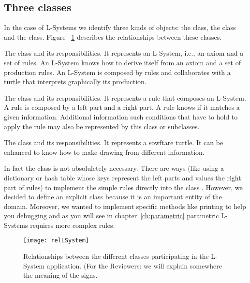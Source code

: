 \subsection{Three classes}
In the case of L-Systems we identify three kinds of objects: the
 class, the  class and the  class. Figure
~\ref{fig:relLSystem} describes the relationships between these classes. 

\begin{description}
\item{The class  and its responsibilities.} It 
represents an L-System, i.e., an axiom and a set of rules. An L-System
knows how to derive itself from an axiom and a set of production
rules.  An L-System is composed by rules and collaborates with a
turtle that interprets graphically its production.

\item{The class  and its responsibilities.} It represents a rule that 
composes an L-System.  A rule is composed by a left part and a right
part. A rule knows if it matches a given information. Additional
information such conditions that have to hold to apply the rule may
also be represented by this class or subclasses.

\item{The class  and its responsibilities.} It represents a sowftare turtle. It can be enhanced to know how to make drawing from different information. 
\end{description}

In fact the class  is not absoluletely necessary. There are
ways (like using a dictionary or hash table whose keys represent the
left parts and values the right part of rules) to implement the simple
rules directly into the class . However, we decided to
define an explicit class  because it is an important entity
of the  domain. Moreover, we wanted to implement specific
methods like printing to help you debugging and as you will see
in chapter~\ref{ch:parametric} parametric L-Systems requires more
complex rules.

\begin{figure}[!htbp]
\centerline{\texttt{[image: relLSystem]}}
\caption{Relationships between the different classes participating in the L-System application. (For the Reviewers: we will explain somewhere the meaning of the signs.}
\label{fig:relLSystem}
\end{figure}




